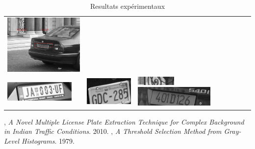 \documentclass[a4paper,10pt,twocolumn]{article}
\begin{document}
\begin{table}[ht]
\begin{tabular}{|m{150px}|m{150px}|m{150px}|}
	  \includegraphics[width=150px]{img/plate_detect_5.png}\tabularnewline
	  \includegraphics[scale=1]{img/plate_3.png}&
	  \includegraphics[scale=1]{img/plate_4.png}&
	  \includegraphics[scale=1]{img/plate_5_0.png} \newline
	  \includegraphics[scale=1]{img/plate_5_1.png}\tabularnewline
	  \hline
	\end{tabular}
	\caption{Resultats expérimentaux\label{result}}
\end{table}


\begin{thebibliography}{9}
  , 
  \emph{A Novel Multiple License Plate Extraction Technique for Complex Background in Indian Traffic Conditions}.
  2010.
  , 
  \emph{A Threshold Selection Method from Gray-Level Histograms}.
  1979.  

\end{thebibliography}
\end{document}
